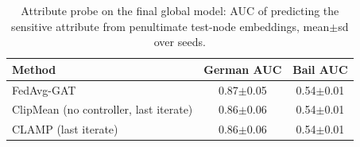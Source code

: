 \begin{table}[t]
\centering
\footnotesize
\caption{Attribute probe on the final global model: AUC of predicting the sensitive attribute from penultimate test-node embeddings, mean$\pm$sd over seeds.}
\label{tab:privacy_probe}
\begin{tabular}{lcc}
\toprule
Method & German AUC & Bail AUC \\
\midrule
FedAvg-GAT & 0.87$\pm$0.05 & 0.54$\pm$0.01 \\
ClipMean (no controller, last iterate) & 0.86$\pm$0.06 & 0.54$\pm$0.01 \\
CLAMP (last iterate) & 0.86$\pm$0.06 & 0.54$\pm$0.01 \\
\bottomrule
\end{tabular}
\end{table}
